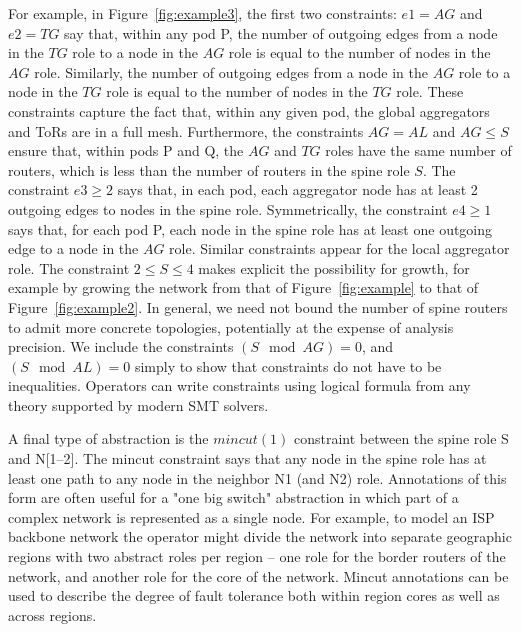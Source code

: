 \documentclass[numbers, 10pt, preprint]{sigplanconf}
\newcommand{\sysname}{{\small \sf Methane}\xspace}
\newcommand{\Mincut}{\mathit{mincut}}
\begin{document}
For example, in Figure~\ref{fig:example3}, the first two constraints: $e1 = AG$ and $e2 = TG$ say that, within any pod P, the number of outgoing edges from a node in the $TG$ role to a node in the $AG$ role is equal to the number of nodes in the $AG$ role. Similarly, the number of outgoing edges from a node in the $AG$ role to a node in the $TG$ role is equal to the number of nodes in the $TG$ role. These constraints capture the fact that, within any given pod, the global aggregators and ToRs are in a full mesh. Furthermore, the constraints $AG = AL$ and $AG \leq S$ ensure that, within pods P and Q, the $AG$ and $TG$ roles have the same number of routers, which is less than the number of routers in the spine role $S$.
%
The constraint $e3 \geq 2$ says that, in each pod, each aggregator node has at least 2 outgoing edges to nodes in the spine role. Symmetrically, the constraint $e4 \geq 1$ says that, for each pod P, each node in the spine role has at least one outgoing edge to a node in the $AG$ role. Similar constraints appear for the local aggregator role. The constraint $2 \leq S \leq 4$ makes explicit the possibility for growth, for example by growing the network from that of Figure~\ref{fig:example} to that of Figure~\ref{fig:example2}. In general, we need not bound the number of spine routers to admit more concrete topologies, potentially at the expense of analysis precision. We include the constraints $(S \mod AG) = 0$, and $(S \mod AL) = 0$ simply to show that constraints do not have to be inequalities. Operators can write constraints using logical formula from any theory supported by modern SMT solvers.

A final type of abstraction is the $\Mincut(1)$ constraint between the spine role S and N[1--2]. The mincut constraint says that any node in the spine role has at least one path to any node in the neighbor N1 (and N2) role. Annotations of this form are often useful for a "one big switch" abstraction \cite{Casado:2010} in which part of a complex network is represented as a single node. For example, to model an ISP backbone network the operator might divide the network into separate geographic regions with two abstract roles per region -- one role for the border routers of the network, and another role for the core of the network. Mincut annotations can be used to describe the degree of fault tolerance both within region cores as well as across regions.

\end{document}
